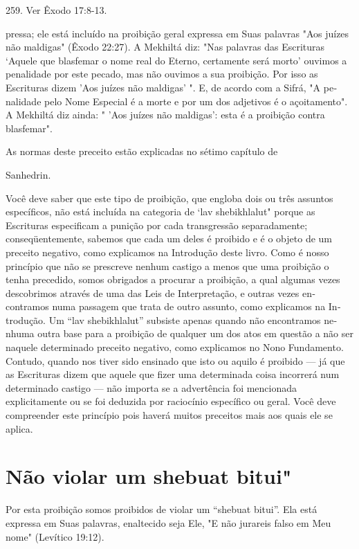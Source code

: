 259. Ver Êxodo 17:8-13.

pressa; ele está incluído na proibição geral expressa em Suas palavras
"Aos juí­zes não maldigas" (Êxodo 22:27). A Mekhiltá diz: "Nas palavras
das Escrituras `Aquele que blasfemar o nome real do Eterno, certamente
será morto' ouvimos a penalidade por este pecado, mas não ouvimos a sua
proibição. Por isso as Escrituras dizem 'Aos juízes não maldigas' ". E,
de acordo com a Sifrá, "A pe­nalidade pelo Nome Especial é a morte e por
um dos adjetivos é o açoitamen­to". A Mekhiltá diz ainda: " 'Aos juízes
não maldigas': esta é a proibição contra blasfemar".


As normas deste preceito estão explicadas no sétimo capítulo de


Sanhedrin.

Você deve saber que este tipo de proibição, que engloba dois ou três
assuntos específicos, não está incluída na categoria de `lav
shebikhlalut" por­que as Escrituras especificam a punição por cada
transgressão separadamente; conseqüentemente, sabemos que cada um deles
é proibido e é o objeto de um preceito negativo, como explicamos na
Introdução deste livro. Como é nosso princípio que não se prescreve
nenhum castigo a menos que uma proibição o tenha precedido, somos
obrigados a procurar a proibição, a qual algumas ve­zes descobrimos
através de uma das Leis de Interpretação, e outras vezes en­contramos
numa passagem que trata de outro assunto, como explicamos na
In­trodução. Um ``lav shebikhlalut'' subsiste apenas quando não
encontramos ne­nhuma outra base para a proibição de qualquer um dos atos
em questão a não ser naquele determinado preceito negativo, como
explicamos no Nono Funda­mento. Contudo, quando nos tiver sido ensinado
que isto ou aquilo é proibido --- já que as Escrituras dizem que aquele
que fizer uma determinada coisa incor­rerá num determinado castigo ---
não importa se a advertência foi mencionada explicitamente ou se foi
deduzida por raciocínio específico ou geral. Você de­ve compreender este
princípio pois haverá muitos preceitos mais aos quais ele se aplica.

\section{Não violar um shebuat bitui"}

Por esta proibição somos proibidos de violar um ``shebuat bitui''. Ela
está expressa em Suas palavras, enaltecido seja Ele, "E não jurareis
falso em Meu nome" (Levítico 19:12).

